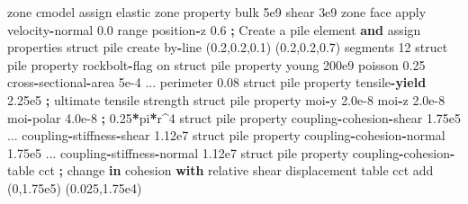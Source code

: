 \documentclass[a4paper, nobind]{templates/ociamthesis}
\newenvironment{Shaded}{\begin{snugshade}}{\end{snugshade}}
\newcommand{\BuiltInTok}[1]{#1}
\newcommand{\ControlFlowTok}[1]{\textcolor[rgb]{0.13,0.29,0.53}{\textbf{#1}}}
\newcommand{\DecValTok}[1]{\textcolor[rgb]{0.00,0.00,0.81}{#1}}
\newcommand{\FloatTok}[1]{\textcolor[rgb]{0.00,0.00,0.81}{#1}}
\newcommand{\KeywordTok}[1]{\textcolor[rgb]{0.13,0.29,0.53}{\textbf{#1}}}
\newcommand{\NormalTok}[1]{#1}
\newcommand{\OperatorTok}[1]{\textcolor[rgb]{0.81,0.36,0.00}{\textbf{#1}}}
\newcommand{\StringTok}[1]{\textcolor[rgb]{0.31,0.60,0.02}{#1}}
\renewenvironment{Shaded}
{
  \vspace{10pt}%
  \begin{snugshade}%
}{%
  \end{snugshade}%
  \vspace{8pt}%
}
\begin{document}
\begin{Shaded}
\begin{Highlighting}[]
\NormalTok{zone cmodel assign elastic}
\NormalTok{zone }\BuiltInTok{property}\NormalTok{ bulk }\FloatTok{5e9}\NormalTok{ shear }\FloatTok{3e9}
\NormalTok{zone face }\BuiltInTok{apply}\NormalTok{ velocity}\OperatorTok{{-}}\NormalTok{normal }\FloatTok{0.0} \BuiltInTok{range}\NormalTok{ position}\OperatorTok{{-}}\NormalTok{z }\FloatTok{0.6}
\OperatorTok{;}\NormalTok{ Create a pile element }\KeywordTok{and}\NormalTok{ assign properties}
\NormalTok{struct pile create by}\OperatorTok{{-}}\NormalTok{line (}\FloatTok{0.2}\NormalTok{,}\FloatTok{0.2}\NormalTok{,}\FloatTok{0.1}\NormalTok{) (}\FloatTok{0.2}\NormalTok{,}\FloatTok{0.2}\NormalTok{,}\FloatTok{0.7}\NormalTok{) segments }\DecValTok{12}
\NormalTok{struct pile }\BuiltInTok{property}\NormalTok{ rockbolt}\OperatorTok{{-}}\NormalTok{flag on}
\NormalTok{struct pile }\BuiltInTok{property}\NormalTok{ young }\FloatTok{200e9}\NormalTok{ poisson }\FloatTok{0.25}\NormalTok{ cross}\OperatorTok{{-}}\NormalTok{sectional}\OperatorTok{{-}}\NormalTok{area }\FloatTok{5e{-}4}\NormalTok{ ...}
\NormalTok{                     perimeter }\FloatTok{0.08}
\NormalTok{struct pile }\BuiltInTok{property}\NormalTok{ tensile}\OperatorTok{{-}}\ControlFlowTok{yield}   \FloatTok{2.25e5}  \OperatorTok{;}\NormalTok{ ultimate tensile strength}
\NormalTok{struct pile }\BuiltInTok{property}\NormalTok{ moi}\OperatorTok{{-}}\NormalTok{y }\FloatTok{2.0e{-}8}\NormalTok{ moi}\OperatorTok{{-}}\NormalTok{z }\FloatTok{2.0e{-}8}\NormalTok{ moi}\OperatorTok{{-}}\NormalTok{polar }\FloatTok{4.0e{-}8} \OperatorTok{;} \FloatTok{0.25}\OperatorTok{*}\NormalTok{pi}\OperatorTok{*}\NormalTok{r}\OperatorTok{\^{}}\DecValTok{4}
\NormalTok{struct pile }\BuiltInTok{property}\NormalTok{ coupling}\OperatorTok{{-}}\NormalTok{cohesion}\OperatorTok{{-}}\NormalTok{shear }\FloatTok{1.75e5}\NormalTok{ ...}
\NormalTok{                     coupling}\OperatorTok{{-}}\NormalTok{stiffness}\OperatorTok{{-}}\NormalTok{shear }\FloatTok{1.12e7}
\NormalTok{struct pile }\BuiltInTok{property}\NormalTok{ coupling}\OperatorTok{{-}}\NormalTok{cohesion}\OperatorTok{{-}}\NormalTok{normal }\FloatTok{1.75e5}\NormalTok{ ...}
\NormalTok{                     coupling}\OperatorTok{{-}}\NormalTok{stiffness}\OperatorTok{{-}}\NormalTok{normal }\FloatTok{1.12e7}
\NormalTok{struct pile }\BuiltInTok{property}\NormalTok{ coupling}\OperatorTok{{-}}\NormalTok{cohesion}\OperatorTok{{-}}\NormalTok{table }\StringTok{\textquotesingle{}cct\textquotesingle{}}
\OperatorTok{;}\NormalTok{ change }\KeywordTok{in}\NormalTok{ cohesion }\ControlFlowTok{with}\NormalTok{ relative shear displacement}
\NormalTok{table }\StringTok{\textquotesingle{}cct\textquotesingle{}}\NormalTok{ add (}\DecValTok{0}\NormalTok{,}\FloatTok{1.75e5}\NormalTok{) (}\FloatTok{0.025}\NormalTok{,}\FloatTok{1.75e4}\NormalTok{)}
\end{Highlighting}
\end{Shaded}
\end{document}
